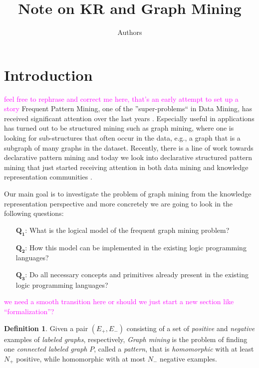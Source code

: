 \documentclass{article}
\author{Authors}
\title{Note on KR and Graph Mining}
\theoremstyle{definition}
\newtheorem{definition}{Definition}[section]
\newcommand{\pair}[1]{\ensuremath{\left(#1\right)}}
\newcommand{\sergey}[1]{\textcolor{magenta}{\marginpar{\sc Sergey} #1}}
\newcommand{\Qone}{$\boldsymbol{Q_1}$\xspace}
\newcommand{\Qtwo}{$\boldsymbol{Q_2}$\xspace}
\newcommand{\Qthree}{$\boldsymbol{Q_3}$\xspace}
\begin{document}
\maketitle

\section{Introduction}
\sergey{feel free to rephrase and correct me here, that's an early attempt to set up a story}
Frequent Pattern Mining, one of the ''super-problems`` in Data Mining, has received significant attention over the last years \citep{pattern_mining_book}. Especially useful in applications has turned out to be structured mining such as graph mining, where one is looking for sub-structures that often occur in the data, e.g., a graph that is a subgraph of many graphs in the dataset. Recently, there is a line of work towards declarative pattern mining \citep{tias_declarative_pattern_mining} and today we look into declarative structured pattern mining that just started receiving attention in both data mining and knowledge representation communities \citep{cp_sequence_mining,ilp_graph_mining}. 

Our main goal is to investigate the problem of graph mining from the knowledge representation perspective and more concretely we are going to look in the following questions:
\begin{itemize}
  \item[\Qone:]   What is the logical model of the frequent graph mining problem?
  \item[\Qtwo:]   How this model can be implemented in the existing logic programming languages?
  \item[\Qthree:] Do all necessary concepts and primitives already present in the existing logic programming languages?
\end{itemize}

\sergey{we need a smooth transition here or should we just start a new section like ``formalization''?}

\begin{definition}
\label{def:GM1}
Given a pair $\pair{E_{+},E_{-}}$ consisting of a set of \emph{positive} and \emph{negative} examples of \emph{labeled graphs}, respectively,
\emph{Graph mining} is the problem of finding one \emph{connected labeled graph} $P$, called a \emph{pattern},
that is \emph{homomorphic} with at least $N_{+}$ positive, while homomorphic with at most $N_{-}$ negative examples.
\end{definition}
\end{document}
